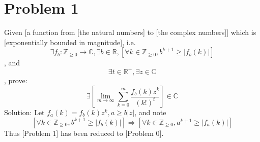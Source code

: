 \documentclass[]{article}
\newcommand{\pqty}[1]{{\left(#1\right)}}
\newcommand{\bqty}[1]{{\left[#1\right]}}
\newcommand{\abs}[1]{{\left\lvert#1\right\rvert}}
\numberwithin{equation}{section}
\begin{document}
	\section{Problem 1}
	Given [a function from [the natural numbers] to [the complex numbers]] which is [exponentially bounded in magnitude], i.e.
	\begin{equation}
		\exists f_b:\mathbb{Z}_{\geq 0}\to\mathbb{C},
		\exists b\in\mathbb{R},
		\bqty{\forall k\in\mathbb{Z}_{\geq 0},
			b^{k+1}\geq\abs{f_b\pqty{k}}}
	\end{equation}
	, and
	\begin{equation}
		\exists t\in\mathbb{R}^+,
		\exists z\in\mathbb{C}
	\end{equation}
	, prove:
	\begin{equation}
		\exists \bqty{\lim\limits_{m\to\infty}\sum_{k=0}^m\frac{f_b\pqty{k}z^k}{\pqty{k!}^t}}
		\in\mathbb{C}
	\end{equation}
	Solution: Let $f_a\pqty{k}=f_b\pqty{k}z^k,a\geq b\abs{z}$, and note
	\begin{equation}
		\bqty{\forall k\in\mathbb{Z}_{\geq 0},
			b^{k+1}\geq\abs{f_b\pqty{k}}}
		\Rightarrow
		\bqty{\forall k\in\mathbb{Z}_{\geq 0},
			a^{k+1}\geq\abs{f_a\pqty{k}}}
	\end{equation}
	Thus [Problem 1] has been reduced to [Problem 0].
\end{document}
